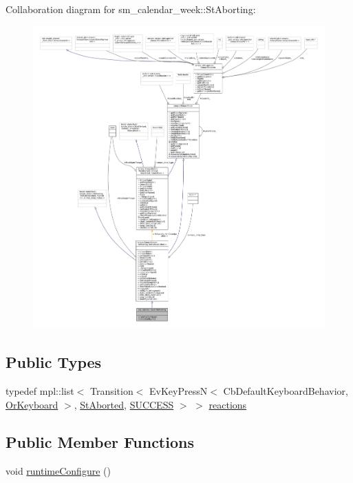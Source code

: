 Collaboration diagram for sm\+\_\+calendar\+\_\+week\+:\+:St\+Aborting\+:
\nopagebreak
\begin{figure}[H]
\begin{center}
\leavevmode
\includegraphics[width=350pt]{structsm__calendar__week_1_1StAborting__coll__graph}
\end{center}
\end{figure}
\subsection*{Public Types}
\begin{DoxyCompactItemize}
\item 
typedef mpl\+::list$<$ Transition$<$ Ev\+Key\+PressN$<$ Cb\+Default\+Keyboard\+Behavior, \hyperlink{classsm__calendar__week_1_1OrKeyboard}{Or\+Keyboard} $>$, \hyperlink{structsm__calendar__week_1_1StAborted}{St\+Aborted}, \hyperlink{classSUCCESS}{S\+U\+C\+C\+E\+SS} $>$ $>$ \hyperlink{structsm__calendar__week_1_1StAborting_a68b769addbd4194bd5263a32d639d891}{reactions}
\end{DoxyCompactItemize}
\subsection*{Public Member Functions}
\begin{DoxyCompactItemize}
\item 
void \hyperlink{structsm__calendar__week_1_1StAborting_aec8ffefd9711f3b6ca998210f5fac17d}{runtime\+Configure} ()
\end{DoxyCompactItemize}
